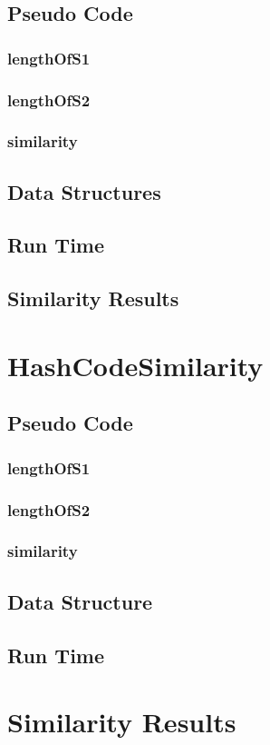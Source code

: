 \documentclass[10pt,letterpaper]{article}
\begin{document}
\subsection{Pseudo Code}
\subsubsection{lengthOfS1}
\subsubsection{lengthOfS2}
\subsubsection{similarity}
\subsection{Data Structures }
\subsection{Run Time}
\subsection{Similarity Results}
\section{HashCodeSimilarity}
\subsection{Pseudo Code}
\subsubsection{lengthOfS1}
\subsubsection{lengthOfS2}
\subsubsection{similarity}	
\subsection{Data Structure }
\subsection{Run Time}
\section{Similarity Results}
\end{document}
